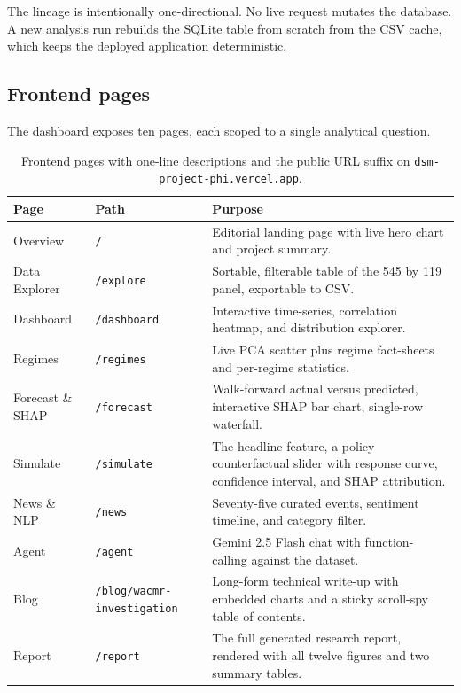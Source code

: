 The lineage is intentionally one-directional. No live request mutates
the database. A new analysis run rebuilds the SQLite table from
scratch from the CSV cache, which keeps the deployed application
deterministic.

\subsection{Frontend pages}

The dashboard exposes ten pages, each scoped to a single analytical
question.

\begin{table}[H]
\caption{Frontend pages with one-line descriptions and the public URL
suffix on \texttt{dsm-project-phi.vercel.app}.}
\label{tab:frontend-pages}
\renewcommand{\arraystretch}{1.18}
\begin{tabularx}{\linewidth}{@{} l l Y @{}}
\toprule
{}\color{white}\textbf{Page} &
\color{white}\textbf{Path} &
\color{white}\textbf{Purpose} \\
\midrule
Overview & \texttt{/} & Editorial landing page with live hero chart and project summary. \\
Data Explorer & \texttt{/explore} & Sortable, filterable table of the 545 by 119 panel, exportable to CSV. \\
Dashboard & \texttt{/dashboard} & Interactive time-series, correlation heatmap, and distribution explorer. \\
Regimes & \texttt{/regimes} & Live PCA scatter plus regime fact-sheets and per-regime statistics. \\
Forecast \& SHAP & \texttt{/forecast} & Walk-forward actual versus predicted, interactive SHAP bar chart, single-row waterfall. \\
Simulate & \texttt{/simulate} & The headline feature, a policy counterfactual slider with response curve, confidence interval, and SHAP attribution. \\
News \& NLP & \texttt{/news} & Seventy-five curated events, sentiment timeline, and category filter. \\
Agent & \texttt{/agent} & Gemini 2.5 Flash chat with function-calling against the dataset. \\
Blog & \texttt{/blog/wacmr-investigation} & Long-form technical write-up with embedded charts and a sticky scroll-spy table of contents. \\
Report & \texttt{/report} & The full generated research report, rendered with all twelve figures and two summary tables. \\
\bottomrule
\end{tabularx}
\end{table}

